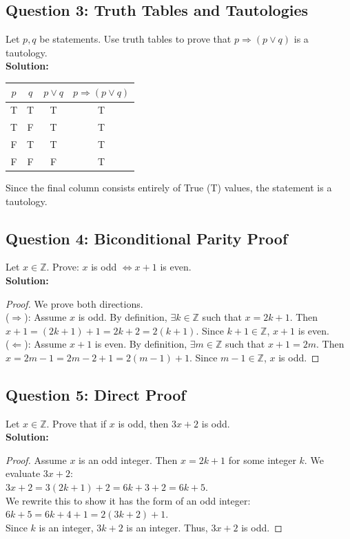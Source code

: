 \documentclass[11pt]{article}
\begin{document}
\subsection*{Question 3: Truth Tables and Tautologies}
Let $p, q$ be statements. Use truth tables to prove that $p \Rightarrow (p \vee q)$ is a tautology.\\
\textbf{Solution:}
\begin{center}
\begin{tabular}{|c|c|c|c|}
\hline
$p$ & $q$ & $p \vee q$ & $p \Rightarrow (p \vee q)$ \\
\hline
T & T & T & T \\
T & F & T & T \\
F & T & T & T \\
F & F & F & T \\
\hline
\end{tabular}
\end{center}
Since the final column consists entirely of True (T) values, the statement is a tautology.

\subsection*{Question 4: Biconditional Parity Proof}
Let $x \in \mathbb{Z}$. Prove: $x$ is odd $\Leftrightarrow x+1$ is even.\\
\textbf{Solution:}
\begin{proof}
We prove both directions. \\
($\Rightarrow$): Assume $x$ is odd. By definition, $\exists k \in \mathbb{Z}$ such that $x = 2k + 1$. Then $x+1 = (2k+1)+1 = 2k+2 = 2(k+1)$. Since $k+1 \in \mathbb{Z}$, $x+1$ is even. \\
($\Leftarrow$): Assume $x+1$ is even. By definition, $\exists m \in \mathbb{Z}$ such that $x+1 = 2m$. Then $x = 2m - 1 = 2m - 2 + 1 = 2(m-1) + 1$. Since $m-1 \in \mathbb{Z}$, $x$ is odd.
\end{proof}

\subsection*{Question 5: Direct Proof}
Let $x \in \mathbb{Z}$. Prove that if $x$ is odd, then $3x+2$ is odd.\\
\textbf{Solution:}
\begin{proof}
Assume $x$ is an odd integer. Then $x = 2k + 1$ for some integer $k$. We evaluate $3x + 2$: \\
$3x + 2 = 3(2k + 1) + 2 = 6k + 3 + 2 = 6k + 5$. \\
We rewrite this to show it has the form of an odd integer: \\
$6k + 5 = 6k + 4 + 1 = 2(3k + 2) + 1$. \\
Since $k$ is an integer, $3k + 2$ is an integer. Thus, $3x + 2$ is odd.
\end{proof}
\end{document}
